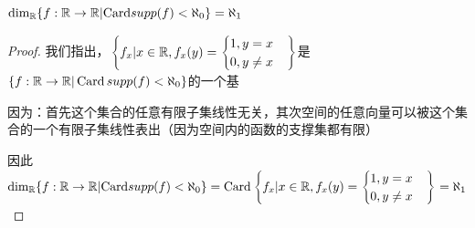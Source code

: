 \documentclass[12pt, a4paper, oneside, UTF8]{ctexbook}
\begin{document}
			\begin{example}
				$\dim_{\mathbb{R}} \{f:{\mathbb{R}} \rightarrow {\mathbb{R}}| {\operatorname{Card}} supp(f) < {\aleph_0}\} = \aleph_1$
			\end{example}
			\begin{proof}
				我们指出，$\left\{ f_x| x \in \mathbb{R},f_x(y) = \begin{cases}
				1,y=x \\
				0,y \neq x
				\end{cases}\right\}$是$\{f:\mathbb{R} \rightarrow \mathbb{R}| \operatorname{Card} supp(f) < \aleph_0\}$的一个基

				因为：首先这个集合的任意有限子集线性无关，其次空间的任意向量可以被这个集合的一个有限子集线性表出（因为空间内的函数的支撑集都有限）

				因此$\dim_{\mathbb{R}} \{f:{\mathbb{R}} \rightarrow {\mathbb{R}}| {\operatorname{Card}} supp(f) < {\aleph_0}\} = \operatorname{Card} \left\{ f_x| x \in \mathbb{R},f_x(y) = \begin{cases}
				1,y=x \\
				0,y \neq x
				\end{cases}\right\} = \aleph_1$
			\end{proof}
\end{document}
